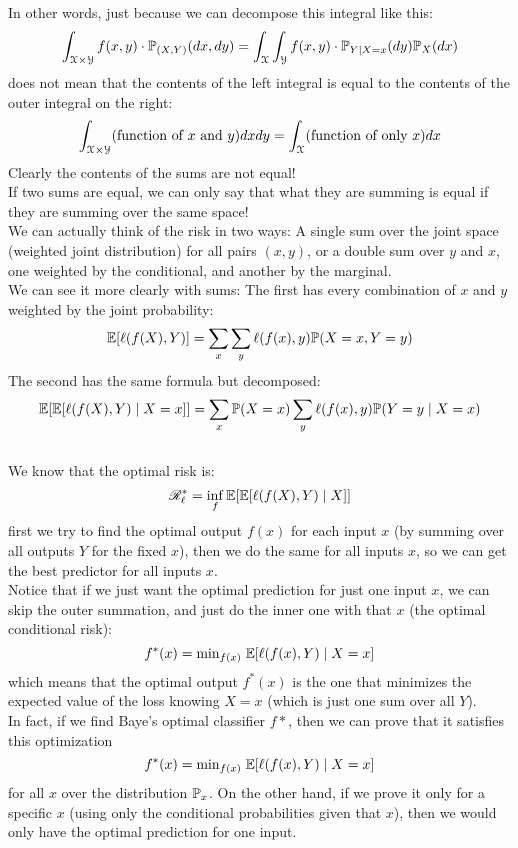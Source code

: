 \documentclass[12pt]{article}
\begin{document}
In other words, just because we can decompose
this integral like this:
\[\int_{\mathcal{X} \times \mathcal{Y}} f(x, y)
\cdot \mathbb{P}_{(X, Y)}(dx, dy) 
= \int_{\mathcal{X}} \int_{\mathcal{Y}} f(x, y)
\cdot \mathbb{P}_{Y \mid X = x}(dy)
\mathbb{P}_X(dx) \]
does not mean that the contents of the left integral
is equal to the contents of the outer integral
on the right:
\[\int_{\mathcal{X} \times \mathcal{Y}} 
(\text{function of $x$ and $y$}) dxdy 
= \int_{\mathcal{X}} (\text{function of only $x$}) dx \]
Clearly the contents of the sums are not equal! \\
If two sums are equal, we can only say
that what they are summing is equal if they are
summing over the same space! \\

We can actually think of the risk in two ways:
A single sum over the joint space (weighted joint
distribution) for all pairs $(x, y)$,
or a double sum over $y$ and $x$,
one weighted by the conditional,
and another by the marginal. \\
We can see it more clearly with sums:
The first has every combination of $x$
and $y$ weighted by the joint probability:
\[ \mathbb{E}[\ell(f(X), Y)]
= \sum_x \sum_y \ell(f(x), y) \mathbb{P}(X = x, Y = y) \]
The second has the same formula but decomposed:
\[ \mathbb{E}[\mathbb{E}[\ell(f(X), Y) \mid X = x]]
= \sum_x \mathbb{P}(X = x) \sum_y \ell(f(x), y) 
\mathbb{P}(Y = y \mid X = x) \] \\

We know that the optimal risk is:
\[ \mathscr{R}_\ell^*
= \inf_f \mathbb{E}[\mathbb{E}[\ell(f(X), Y) \mid X]] \]
first we try to find the optimal
output $f(x)$ for each input $x$
(by summing over all outputs $Y$ for the fixed $x$),
then we do the same for all inputs $x$,
so we can get the best predictor for
all inputs $x$. \\

Notice that if we just want the optimal
prediction for just one input $x$,
we can skip the outer summation,
and just do the inner one with that $x$
(the optimal conditional risk):
\[ f^*(x) = \text{min}_{f(x)} \;
\mathbb{E}[\ell(f(x), Y) \mid X = x] \]
which means that the optimal output $f^*(x)$
is the one that minimizes the expected value
of the loss knowing $X = x$
(which is just one sum over all $Y$). \\

In fact, if we find Baye's optimal classifier
$f*$,
then we can prove that it satisfies this optimization
\[ f^*(x) = \text{min}_{f(x)} \;
\mathbb{E}[\ell(f(x), Y) \mid X = x] \]
for all $x$ over the distribution $\mathbb{P}_x$.
On the other hand, if we prove it only
for a specific $x$ (using only the conditional
probabilities given that $x$),
then we would only have the optimal
prediction for one input. \\
\end{document}
